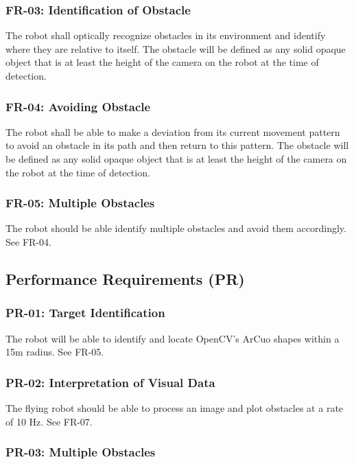 \documentclass{article}
\begin{document}
		\subsubsection{FR-03: Identification of Obstacle}
		The robot shall optically recognize obstacles in its environment and identify where they are relative to itself. The obstacle will be defined as any solid opaque object that is at least the height of the camera on the robot at the time of detection.
		
		\subsubsection{FR-04: Avoiding Obstacle}
		The robot shall be able to make a deviation from its current movement pattern to avoid an obstacle in its path and then return to this pattern. The obstacle will be defined as any solid opaque object that is at least the height of the camera on the robot at the time of detection.
		
		\subsubsection{FR-05: Multiple Obstacles}
		The robot should be able identify multiple obstacles and avoid them accordingly. See FR-04. 
		
	\subsection{Performance Requirements (PR)}
	
		\subsubsection{PR-01: Target Identification}
		
		The robot will be able to identify and locate OpenCV's ArCuo shapes within a 15m radius. See FR-05.
		
		\subsubsection{PR-02: Interpretation of Visual Data}
		
		The flying robot should be able to process an image and plot obstacles at a rate of 10 Hz. See FR-07.
		
		\subsubsection{PR-03: Multiple Obstacles}
		
\end{document}
